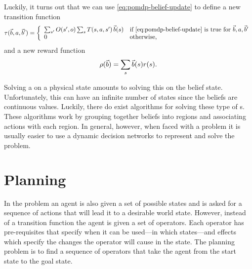 Luckily, it turns out that we can use \eqref{eq:pomdp-belief-update}
to define a new transition function
\begin{equation}
  \label{eq:pomdp-transition}
  \tau(\vec{b},a,\vec{b}') = \left\{ 
      \begin{array}{ll}
        \sum_{s'}O(s',o) \sum_s T(s,a,s')\,\vec{b}(s) & \text{if
          \eqref{eq:pomdp-belief-update} is true for }\vec{b},a,\vec{b}' \\
        0 & \text{otherwise,}
      \end{array}
      \right.
\end{equation}
and a new reward function
\begin{equation}
  \label{eq:pomdp-reward}
  \rho(\vec{b}) = \sum_s \vec{b}(s) r(s).
\end{equation}

Solving a  on a physical state amounts to solving this
 on the belief state. Unfortunately, this  can
have an infinite number of states since the beliefs are continuous
values. Luckily, there do exist algorithms for solving these type of
s. These algorithms work by grouping together beliefs into
regions and associating actions with each region. In general, however, when faced with a 
problem it is usually easier to use a dynamic decision networks to
represent and solve the problem.


\section{Planning}
\label{sec:planning}

In the  problem an agent is also
given a set of possible states and is asked for a sequence of actions
that will lead it to a desirable world state. However, instead of a
transition function the agent is given a set of operators.  Each
operator has pre-requisites that specify when it can be used---in
which states---and effects which specify the changes the operator will
cause in the state. The planning problem is to find a sequence of
operators that take the agent from the start state to the goal state.

